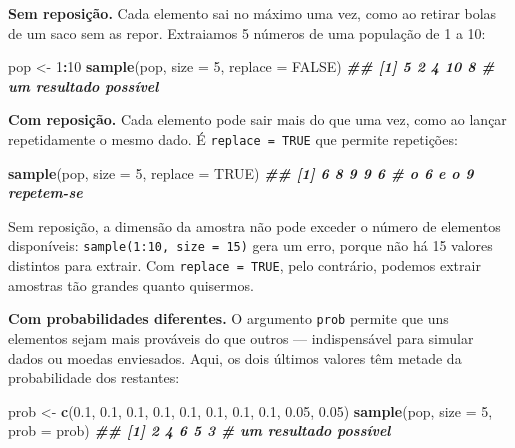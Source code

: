 \documentclass[
  portuguese,
  11pt,
  openany]{book}
\newenvironment{Shaded}{\begin{snugshade}}{\end{snugshade}}
\newcommand{\AttributeTok}[1]{\textcolor[rgb]{0.13,0.29,0.53}{#1}}
\newcommand{\ConstantTok}[1]{\textcolor[rgb]{0.56,0.35,0.01}{#1}}
\newcommand{\DecValTok}[1]{\textcolor[rgb]{0.00,0.00,0.81}{#1}}
\newcommand{\DocumentationTok}[1]{\textcolor[rgb]{0.56,0.35,0.01}{\textbf{\textit{#1}}}}
\newcommand{\FloatTok}[1]{\textcolor[rgb]{0.00,0.00,0.81}{#1}}
\newcommand{\FunctionTok}[1]{\textcolor[rgb]{0.13,0.29,0.53}{\textbf{#1}}}
\newcommand{\NormalTok}[1]{#1}
\newcommand{\OtherTok}[1]{\textcolor[rgb]{0.56,0.35,0.01}{#1}}
\newcommand{\SpecialCharTok}[1]{\textcolor[rgb]{0.81,0.36,0.00}{\textbf{#1}}}
\begin{document}
\textbf{Sem reposição.} Cada elemento sai no máximo uma vez, como ao retirar bolas de um saco
sem as repor. Extraiamos 5 números de uma população de 1 a 10:

\begin{Shaded}
\begin{Highlighting}[]
\NormalTok{pop }\OtherTok{\textless{}{-}} \DecValTok{1}\SpecialCharTok{:}\DecValTok{10}
\FunctionTok{sample}\NormalTok{(pop, }\AttributeTok{size =} \DecValTok{5}\NormalTok{, }\AttributeTok{replace =} \ConstantTok{FALSE}\NormalTok{)}
\DocumentationTok{\#\# [1]  5  2  4 10  8      \# um resultado possível}
\end{Highlighting}
\end{Shaded}

\textbf{Com reposição.} Cada elemento pode sair mais do que uma vez, como ao lançar
repetidamente o mesmo dado. É \texttt{replace\ =\ TRUE} que permite repetições:

\begin{Shaded}
\begin{Highlighting}[]
\FunctionTok{sample}\NormalTok{(pop, }\AttributeTok{size =} \DecValTok{5}\NormalTok{, }\AttributeTok{replace =} \ConstantTok{TRUE}\NormalTok{)}
\DocumentationTok{\#\# [1] 6 8 9 9 6           \# o 6 e o 9 repetem{-}se}
\end{Highlighting}
\end{Shaded}

Sem reposição, a dimensão da amostra não pode exceder o número de elementos disponíveis:
\texttt{sample(1:10,\ size\ =\ 15)} gera um erro, porque não há 15 valores distintos para
extrair. Com \texttt{replace\ =\ TRUE}, pelo contrário, podemos extrair amostras tão grandes
quanto quisermos.

\textbf{Com probabilidades diferentes.} O argumento \texttt{prob} permite que uns elementos sejam
mais prováveis do que outros --- indispensável para simular dados ou moedas
enviesados. Aqui, os dois últimos valores têm metade da probabilidade dos restantes:

\begin{Shaded}
\begin{Highlighting}[]
\NormalTok{prob }\OtherTok{\textless{}{-}} \FunctionTok{c}\NormalTok{(}\FloatTok{0.1}\NormalTok{, }\FloatTok{0.1}\NormalTok{, }\FloatTok{0.1}\NormalTok{, }\FloatTok{0.1}\NormalTok{, }\FloatTok{0.1}\NormalTok{, }\FloatTok{0.1}\NormalTok{, }\FloatTok{0.1}\NormalTok{, }\FloatTok{0.1}\NormalTok{, }\FloatTok{0.05}\NormalTok{, }\FloatTok{0.05}\NormalTok{)}
\FunctionTok{sample}\NormalTok{(pop, }\AttributeTok{size =} \DecValTok{5}\NormalTok{, }\AttributeTok{prob =}\NormalTok{ prob)}
\DocumentationTok{\#\# [1] 2 4 6 5 3           \# um resultado possível}
\end{Highlighting}
\end{Shaded}
\end{document}
